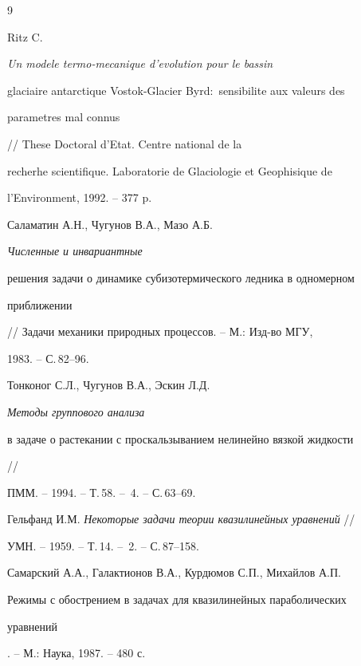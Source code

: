 \begin{thebibliography}{9} 


 




Ritz C. {\em Un modele termo-mecanique d'evolution pour le bassin


glaciaire antarctique Vostok-Glacier Byrd$:$ sensibilite aux valeurs des


parametres mal connus} // These Doctoral d'Etat. Centre national de la


recherhe scientifique. Laboratorie de Glaciologie et Geophisique de


l'Environment, 1992. -- 377 p.




Саламатин А.Н., Чугунов В.А., Мазо А.Б. {\em Численные и инвариантные 


решения задачи о динамике субизотермического ледника в одномерном 


приближении} // Задачи механики природных процессов. -- М.: Изд-во МГУ, 


1983. -- С.\,82--96. 




Тонконог С.Л., Чугунов В.А., Эскин Л.Д. {\em Методы группового анализа 


в задаче о растекании с проскальзыванием нелинейно вязкой жидкости} // 


ПММ. -- 1994. -- Т.\,58. -- \No\,4. -- С.\,63--69. 




Гельфанд И.М. {\em Некоторые задачи теории квазилинейных уравнений} // 


УМН. -- 1959. -- Т.\,14. -- \No\,2. -- С.\,87--158. 




Самарский А.А., Галактионов В.А., Курдюмов С.П., Михайлов А.П. {\em 


Режимы с обострением в задачах для квазилинейных параболических 


уравнений}. -- М.: Наука, 1987. -- 480 с. 


 


\end{thebibliography} 


 


\vskip 2cm 


 








 


\label{end} 


 


